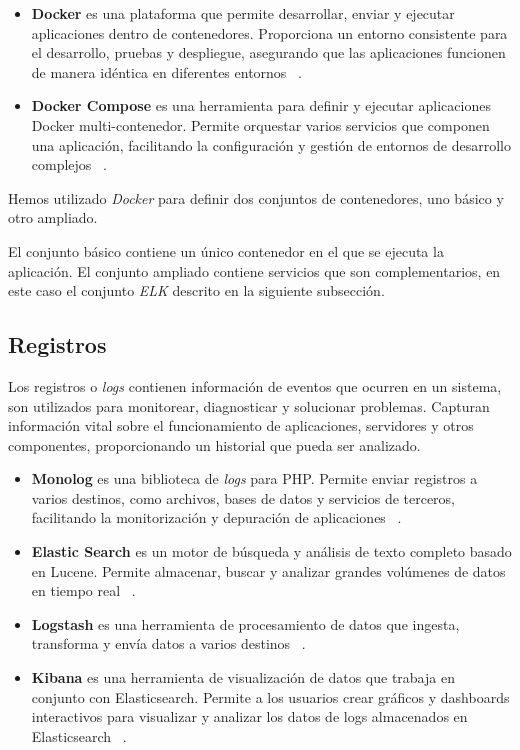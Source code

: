 \begin{itemize}
    \item \textbf{Docker} es una plataforma que permite desarrollar, enviar y ejecutar aplicaciones dentro de
    contenedores.
    Proporciona un entorno consistente para el desarrollo, pruebas y despliegue, asegurando que las aplicaciones
    funcionen de manera idéntica en diferentes entornos ~\cite{url_docker}.
    \item \textbf{Docker Compose} es una herramienta para definir y ejecutar aplicaciones Docker multi-contenedor.
    Permite orquestar varios servicios que componen una aplicación, facilitando la configuración y gestión de entornos
    de desarrollo complejos ~\cite{url_docker_compose}.
\end{itemize}

Hemos utilizado \textit{Docker} para definir dos conjuntos de contenedores, uno básico y otro ampliado.

El conjunto básico contiene un único contenedor en el que se ejecuta la aplicación.
El conjunto ampliado contiene servicios que son complementarios, en este caso el conjunto \textit{ELK} descrito en la
siguiente subsección.

\subsection*{Registros}\label{subsec:chapter_4.logs}

Los registros o \textit{logs} contienen información de eventos que ocurren en un sistema, son utilizados para
monitorear, diagnosticar y solucionar problemas.
Capturan información vital sobre el funcionamiento de aplicaciones, servidores y otros componentes, proporcionando un
historial que pueda ser analizado.

\begin{itemize}
    \item \textbf{Monolog} es una biblioteca de \textit{logs} para PHP. Permite enviar registros a varios destinos, como
    archivos, bases de datos y servicios de terceros, facilitando la monitorización y depuración de aplicaciones
    ~\cite{url_monolog}.
    \item \textbf{Elastic Search} es un motor de búsqueda y análisis de texto completo basado en Lucene.
    Permite almacenar, buscar y analizar grandes volúmenes de datos en tiempo real
    ~\cite{url_elasticsearch}.
    \item \textbf{Logstash} es una herramienta de procesamiento de datos que ingesta, transforma y envía datos a varios
    destinos ~\cite{url_logstash}.
    \item \textbf{Kibana} es una herramienta de visualización de datos que trabaja en conjunto con Elasticsearch.
    Permite a los usuarios crear gráficos y dashboards interactivos para visualizar y analizar los datos de logs
    almacenados en Elasticsearch ~\cite{url_kibana}.
\end{itemize}

